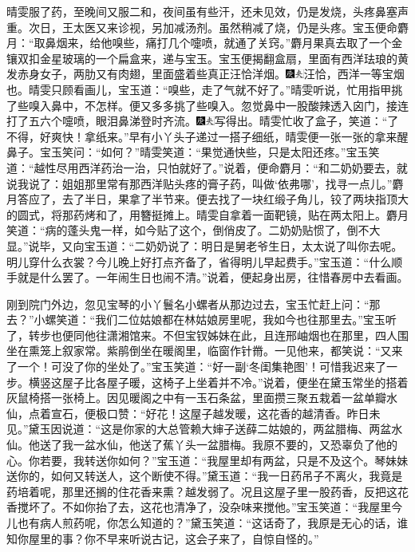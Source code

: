 晴雯服了药，至晚间又服二和，夜间虽有些汗，还未见效，仍是发烧，头疼鼻塞声重。次日，王太医又来诊视，另加减汤剂。虽然稍减了烧，仍是头疼。宝玉便命麝月：``取鼻烟来，给他嗅些，痛打几个嚏喷，就通了关窍。''麝月果真去取了一个金镶双扣金星玻璃的一个扁盒来，递与宝玉。宝玉便揭翻盒扇，里面有西洋珐琅的黄发赤身女子，两肋又有肉翅，里面盛着些真正汪恰洋烟。{\includegraphics[width=3mm]{../Images/00004}\includegraphics[width=3mm]{../Images/00012}\footnotesize \kaishu 汪恰，西洋一等宝烟也。}晴雯只顾看画儿，宝玉道：``嗅些，走了气就不好了。''晴雯听说，忙用指甲挑了些嗅入鼻中，不怎样。便又多多挑了些嗅入。忽觉鼻中一股酸辣透入囟门，接连打了五六个嚏喷，眼泪鼻涕登时齐流。{\includegraphics[width=3mm]{../Images/00004}\includegraphics[width=3mm]{../Images/00012}\footnotesize \kaishu 写得出。}晴雯忙收了盒子，笑道：``了不得，好爽快！拿纸来。''早有小丫头子递过一搭子细纸，晴雯便一张一张的拿来醒鼻子。宝玉笑问：``如何？''晴雯笑道：``果觉通快些，只是太阳还疼。''宝玉笑道：``越性尽用西洋药治一治，只怕就好了。''说着，便命麝月：``和二奶奶要去，就说我说了：姐姐那里常有那西洋贴头疼的膏子药，叫做`依弗哪'，找寻一点儿。''麝月答应了，去了半日，果拿了半节来。便去找了一块红缎子角儿，铰了两块指顶大的圆式，将那药烤和了，用簪挺摊上。晴雯自拿着一面靶镜，贴在两太阳上。麝月笑道：``病的蓬头鬼一样，如今贴了这个，倒俏皮了。二奶奶贴惯了，倒不大显。''说毕，又向宝玉道：``二奶奶说了：明日是舅老爷生日，太太说了叫你去呢。明儿穿什么衣裳？今儿晚上好打点齐备了，省得明儿早起费手。''宝玉道：``什么顺手就是什么罢了。一年闹生日也闹不清。''说着，便起身出房，往惜春房中去看画。

刚到院门外边，忽见宝琴的小丫鬟名小螺者从那边过去，宝玉忙赶上问：``那去？''小螺笑道：``我们二位姑娘都在林姑娘房里呢，我如今也往那里去。''宝玉听了，转步也便同他往潇湘馆来。不但宝钗姊妹在此，且连邢岫烟也在那里，四人围坐在熏笼上叙家常。紫鹃倒坐在暖阁里，临窗作针黹。一见他来，都笑说：``又来了一个！可没了你的坐处了。''宝玉笑道：``好一副`冬闺集艳图'！可惜我迟来了一步。横竖这屋子比各屋子暖，这椅子上坐着并不冷。''说着，便坐在黛玉常坐的搭着灰鼠椅搭一张椅上。因见暖阁之中有一玉石条盆，里面攒三聚五栽着一盆单瓣水仙，点着宣石，便极口赞：``好花！这屋子越发暖，这花香的越清香。昨日未见。''黛玉因说道：``这是你家的大总管赖大婶子送薛二姑娘的，两盆腊梅、两盆水仙。他送了我一盆水仙，他送了蕉丫头一盆腊梅。我原不要的，又恐辜负了他的心。你若要，我转送你如何？''宝玉道：``我屋里却有两盆，只是不及这个。琴妹妹送你的，如何又转送人，这个断使不得。''黛玉道：``我一日药吊子不离火，我竟是药培着呢，那里还搁的住花香来熏？越发弱了。况且这屋子里一股药香，反把这花香搅坏了。不如你抬了去，这花也清净了，没杂味来搅他。''宝玉笑道：``我屋里今儿也有病人煎药呢，你怎么知道的？''黛玉笑道：``这话奇了，我原是无心的话，谁知你屋里的事？你不早来听说古记，这会子来了，自惊自怪的。''

